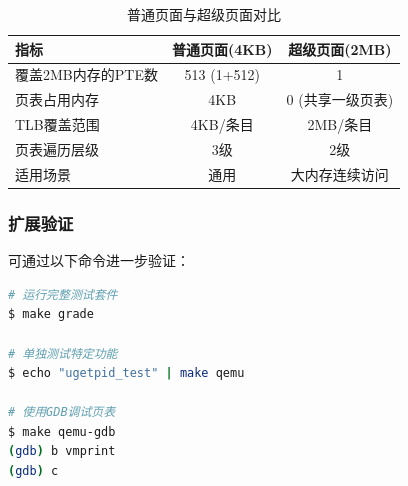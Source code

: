 \begin{table}[H]
\centering
\begin{tabular}{|l|c|c|}
\hline
\textbf{指标} & \textbf{普通页面(4KB)} & \textbf{超级页面(2MB)} \\
\hline
覆盖2MB内存的PTE数 & 513 (1+512) & 1 \\
页表占用内存 & 4KB & 0 (共享一级页表) \\
TLB覆盖范围 & 4KB/条目 & 2MB/条目 \\
页表遍历层级 & 3级 & 2级 \\
适用场景 & 通用 & 大内存连续访问 \\
\hline
\end{tabular}
\caption{普通页面与超级页面对比}
\end{table}

\subsubsection{扩展验证}

可通过以下命令进一步验证：

\begin{lstlisting}[language=bash]
# 运行完整测试套件
$ make grade

# 单独测试特定功能
$ echo "ugetpid_test" | make qemu

# 使用GDB调试页表
$ make qemu-gdb
(gdb) b vmprint
(gdb) c
\end{lstlisting}